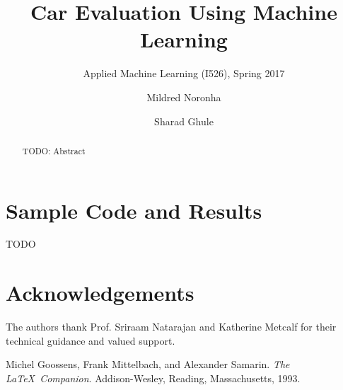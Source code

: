 \documentclass[sigconf]{acmart}
\begin{document}
\title{Car Evaluation Using Machine Learning}
\subtitle{Applied Machine Learning (I526), Spring 2017}
\author{Mildred Noronha}

\author{Sharad Ghule}
\begin{abstract}
TODO: Abstract
\end{abstract}
\maketitle








\appendix
\section{Sample Code and Results}
TODO


\section{Acknowledgements}
 The authors thank Prof. Sriraam Natarajan and Katherine Metcalf for their technical guidance and valued support.

\medskip
 
\begin{thebibliography}{9}
Michel Goossens, Frank Mittelbach, and Alexander Samarin. 
\textit{The \LaTeX\ Companion}. 
Addison-Wesley, Reading, Massachusetts, 1993.
\end{thebibliography}
\end{document}
